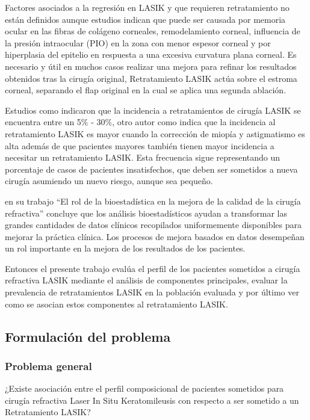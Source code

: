 Factores asociados a la regresión en LASIK y que requieren retratamiento no están definidos aunque estudios indican que puede ser causada por memoria ocular en las fibras de colágeno corneales, remodelamiento corneal, influencia de la presión intraocular (PIO) en la zona con menor espesor corneal y por hiperplasia del epitelio en respuesta a una excesiva curvatura plana corneal. Es necesario y útil en muchos casos realizar una mejora para refinar los resultados obtenidos tras la cirugía original, Retratamiento LASIK actúa sobre el estroma corneal, separando el flap original en la cual se aplica una segunda ablación.

Estudios como \citep{pravato2009inc} indicaron que la incidencia a retratamientos de cirugía LASIK se encuentra entre un 5$\%$ - $30\%$, otro autor como \citep{Hersh_2003} indica que la incidencia al retratamiento LASIK es mayor cuando la corrección de miopía y astigmatismo es alta además de que pacientes mayores también tienen mayor incidencia a necesitar un retratamiento LASIK. Esta frecuencia sigue representando un porcentaje de casos de pacientes insatisfechos, que deben ser sometidos a nueva cirugía asumiendo un nuevo riesgo, aunque sea pequeño.

\citep{Hettinger_2009} en su trabajo ``El rol de la bioestadística en la mejora de la calidad de la cirugía refractiva'' concluye que los análisis bioestadísticos ayudan a transformar las grandes cantidades de datos clínicos recopilados uniformemente disponibles para mejorar la práctica clínica. Los procesos de mejora basados en datos desempeñan un rol importante en la mejora de los resultados de los pacientes.

Entonces el presente trabajo evalúa el perfil de los pacientes sometidos a cirugía refractiva LASIK mediante el análisis de componentes principales, evaluar la prevalencia de retratamientos LASIK en la población evaluada y por último ver como se asocian estos componentes al retratamiento LASIK.


\subsection{Formulación del problema}
\subsubsection{Problema general}
¿Existe asociación entre el perfil composicional de pacientes sometidos para cirugía refractiva Laser In Situ Keratomileusis con respecto a ser sometido a un Retratamiento LASIK?
 
